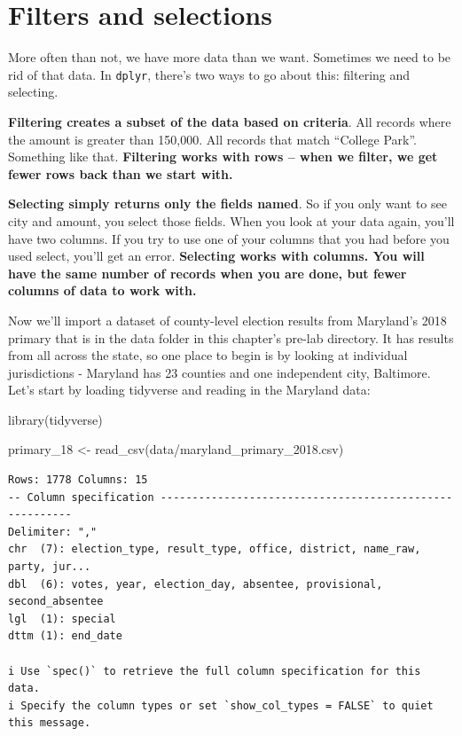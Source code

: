 \documentclass[
  letterpaper,
  DIV=11,
  numbers=noendperiod]{scrreprt}
\newenvironment{Shaded}{\begin{snugshade}}{\end{snugshade}}
\newcommand{\FunctionTok}[1]{\textcolor[rgb]{0.28,0.35,0.67}{#1}}
\newcommand{\NormalTok}[1]{\textcolor[rgb]{0.00,0.23,0.31}{#1}}
\newcommand{\OtherTok}[1]{\textcolor[rgb]{0.00,0.23,0.31}{#1}}
\newcommand{\StringTok}[1]{\textcolor[rgb]{0.13,0.47,0.30}{#1}}
\begin{document}
\hypertarget{filters-and-selections}{%
\chapter{Filters and selections}\label{filters-and-selections}}

More often than not, we have more data than we want. Sometimes we need
to be rid of that data. In \texttt{dplyr}, there's two ways to go about
this: filtering and selecting.

\textbf{Filtering creates a subset of the data based on criteria}. All
records where the amount is greater than 150,000. All records that match
``College Park''. Something like that. \textbf{Filtering works with rows
-- when we filter, we get fewer rows back than we start with.}

\textbf{Selecting simply returns only the fields named}. So if you only
want to see city and amount, you select those fields. When you look at
your data again, you'll have two columns. If you try to use one of your
columns that you had before you used select, you'll get an error.
\textbf{Selecting works with columns. You will have the same number of
records when you are done, but fewer columns of data to work with.}

Now we'll import a dataset of county-level election results from
Maryland's 2018 primary that is in the data folder in this chapter's
pre-lab directory. It has results from all across the state, so one
place to begin is by looking at individual jurisdictions - Maryland has
23 counties and one independent city, Baltimore. Let's start by loading
tidyverse and reading in the Maryland data:

\begin{Shaded}
\begin{Highlighting}[]
\FunctionTok{library}\NormalTok{(tidyverse)}
\end{Highlighting}
\end{Shaded}

\begin{Shaded}
\begin{Highlighting}[]
\NormalTok{primary\_18 }\OtherTok{\textless{}{-}} \FunctionTok{read\_csv}\NormalTok{(}\StringTok{\textquotesingle{}data/maryland\_primary\_2018.csv\textquotesingle{}}\NormalTok{)}
\end{Highlighting}
\end{Shaded}

\begin{verbatim}
Rows: 1778 Columns: 15
-- Column specification --------------------------------------------------------
Delimiter: ","
chr  (7): election_type, result_type, office, district, name_raw, party, jur...
dbl  (6): votes, year, election_day, absentee, provisional, second_absentee
lgl  (1): special
dttm (1): end_date

i Use `spec()` to retrieve the full column specification for this data.
i Specify the column types or set `show_col_types = FALSE` to quiet this message.
\end{verbatim}
\end{document}
